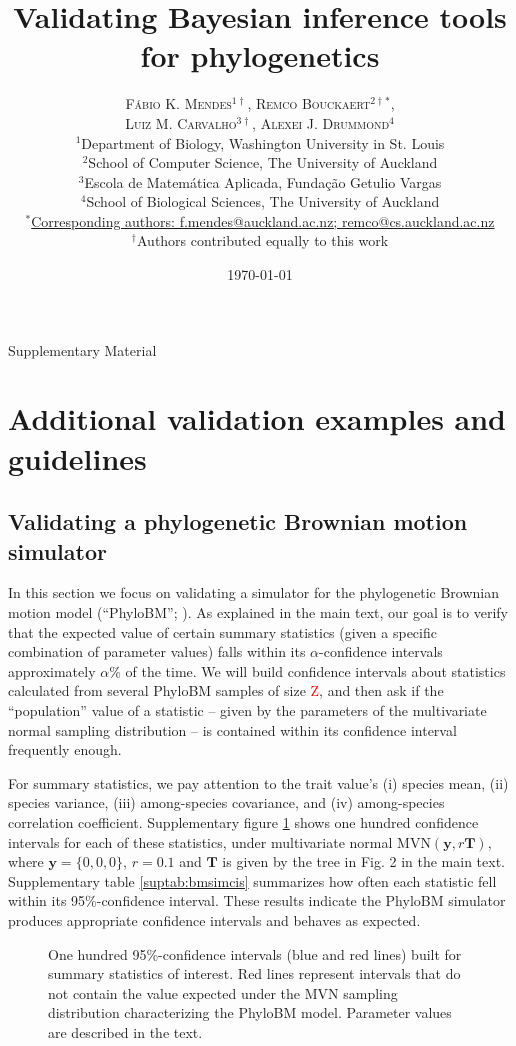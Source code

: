 \documentclass[oneside]{article}
\title{Validating Bayesian inference tools for phylogenetics} %
\author{\textsc{F\'{a}bio K. Mendes$^{1\dagger}$}, \textsc{Remco Bouckaert$^{2\dagger*}$},\\
\textsc{Luiz M. Carvalho$^{3\dagger}$}, \textsc{Alexei J. Drummond$^{4}$} \\
\small $^1$Department of Biology, Washington University in St. Louis\\
\small $^2$School of Computer Science, The University of Auckland\\
\small $^3$Escola de Matem\'{a}tica Aplicada, Fundaç\~{a}o Getulio Vargas\\
\small $^4$School of Biological Sciences, The University of Auckland\\
\small
\href{mailto:f.mendes@auckland.ac.nz}{$^*$Corresponding authors:
  f.mendes@auckland.ac.nz; remco@cs.auckland.ac.nz}\\
{\small $^\dagger$Authors contributed equally to this work}
}
\date{\today} %
\begin{document}
\maketitle

\begin{center}
    \Large Supplementary Material
\end{center}

\newpage
\section{Additional validation examples and guidelines}

\subsection{Validating a phylogenetic Brownian motion simulator}

In this section we focus on validating a simulator for the phylogenetic Brownian motion
model (``PhyloBM''; \citealp{felsenstein73}).
As explained in the main text, our goal is to verify that the expected value of certain
summary statistics (given a specific combination of parameter values) falls within its
$\alpha$-confidence intervals approximately $\alpha$\% of the time.
We will build confidence intervals about statistics calculated from several PhyloBM
samples of size \textcolor{red}{Z}, and then ask if the ``population'' value of 
a statistic -- given by the parameters of the multivariate normal sampling distribution --
is contained within its confidence interval frequently enough.

For summary statistics, we pay attention to the trait value's (i) species mean, (ii)
species variance, (iii) among-species covariance, and (iv) among-species correlation
coefficient.
Supplementary figure \ref{supfig:bmsimcis} shows one hundred confidence intervals for
each of these statistics, under multivariate normal $\text{MVN}(\boldsymbol{y},r\boldsymbol{T})$,
where $\boldsymbol{y}=\{0,0,0\}$, $r=0.1$ and $\boldsymbol{T}$ is given by the tree in
Fig. 2 in the main text.
Supplementary table \ref{suptab:bmsimcis} summarizes how often each statistic fell within
its 95\%-confidence interval.
These results indicate the PhyloBM simulator produces appropriate confidence intervals
and behaves as expected.

\begin{figure}
  \centering
  
  \caption{One hundred 95\%-confidence intervals (blue and red
    lines) built for summary statistics of interest.
    Red lines represent intervals that do not contain the value
    expected under the MVN sampling distribution characterizing
    the PhyloBM model.
    Parameter values are described in the text.}
  \label{supfig:bmsimcis}
\end{figure}
\end{document}
